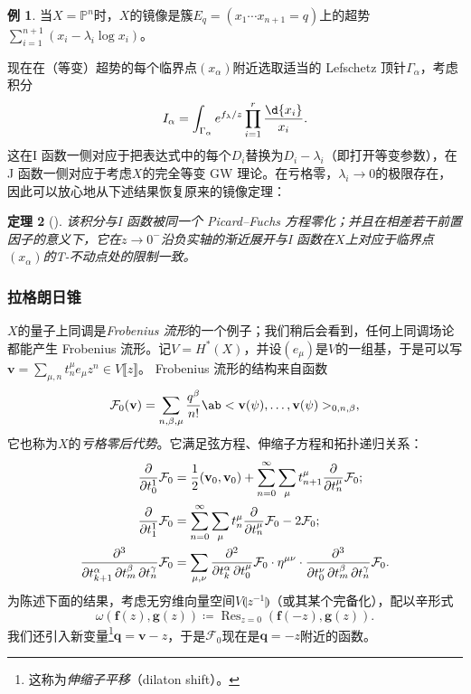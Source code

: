 \documentclass{amsart}
\newtheorem{thm}{定理}[section]
\theoremstyle{definition}
\newtheorem{exm}[thm]{例}
\theoremstyle{remark}
\theoremstyle{plain}
\theoremstyle{definition}
\theoremstyle{remark}
\renewcommand{\P}{\mathbb{P}}
\newcommand{\mc}[1]{\mathcal{#1}}
\newcommand{\mbf}[1]{\mathbf{#1}}
\newcommand{\bv}{\mbf{v}}
\newcommand{\bq}{\mbf{q}}
\newcommand{\on}[1]{\operatorname{#1}}
\newcommand{\1}{\mathbf{1}}
\newcommand{\2}{\mathbf{2}}
\newcommand{\3}{\mathbf{3}}
\newcommand{\ps}[1]{\llbracket #1 \rrbracket}
\newcommand{\ls}[1]{\llparenthesis #1 \rrparenthesis}
\begin{document}
\begin{exm}
    当\(X = \P^n\)时，\(X\)的镜像是簇\(E_q = (x_1 \cdots x_{n+1} = q)\)上的超势\(\sum_{i=1}^{n+1} (x_i - \lambda_i \log x_i)\)。
\end{exm}

现在在（等变）超势的每个临界点\((x_{\alpha})\)附近选取适当的 Lefschetz 顶针\(\Gamma_{\alpha}\)，考虑积分
\[ I_{\alpha} = \int_{\Gamma_{\alpha}} e^{f_{\lambda}/z} \prod_{i=1}^r \frac{\d{x_i}}{x_i}. \]
这在I 函数一侧对应于把表达式中的每个\(D_i\)替换为\(D_i - \lambda_i\)（即打开等变参数），在J 函数一侧对应于考虑\(X\)的完全等变 GW 理论。在亏格零，\(\lambda_i \to 0\)的极限存在，因此可以放心地从下述结果恢复原来的镜像定理：

\begin{thm}[{\cite{Givental1996}}]
    该积分与I 函数被同一个 Picard--Fuchs 方程零化；并且在相差若干前置因子的意义下，它在\(z \to 0^-\)沿负实轴的渐近展开与I 函数在\(X\)上对应于临界点\(( x_{\alpha} )\)的T-不动点处的限制一致。
\end{thm}


\subsubsection{拉格朗日锥}%
\label{ssub:The Lagrangian cone}

\(X\)的量子上同调是\textit{Frobenius 流形}的一个例子；我们稍后会看到，任何上同调场论都能产生 Frobenius 流形。记\(V = H^*(X)\)，并设\((e_{\mu})\)是\(V\)的一组基，于是可以写$\bv = \sum_{\mu,n} t^{\mu}_n e_{\mu} z^n \in V\ps{z}$。
Frobenius 流形的结构来自函数
\[
    \mc{F}_0(\bv) = \sum_{n, \beta, \mu} \frac{q^{\beta}}{n!} \ab<\bv(\psi), \ldots, \bv(\psi)>_{0,n,\beta},
\]
它也称为\(X\)的\textit{亏格零后代势}。它满足弦方程、伸缩子方程和拓扑递归关系：
\begin{align*}
    \pdv{}{t_0^1} \mc{F}_0 &= \frac{1}{2} (\bv_0, \bv_0) + \sum_{n=0}^{\infty} \sum_{\mu} t_{n+1}^{\mu} \pdv{}{t_n^{\mu}} \mc{F}_0; \\
    \pdv{}{t_1^1} \mc{F}_0 &= \sum_{n=0}^{\infty} \sum_{\mu} t_n^{\mu} \pdv{}{t_n^{\mu}}\mc{F}_0 - 2 \mc{F}_0; \\
    \pdv{}{t_{k+1}^{\alpha},t_m^{\beta},t_n^{\gamma}} \mc{F}_0 &= \sum_{\mu,\nu} \pdv{}{t_k^{\alpha},t_0^{\mu}} \mc{F}_0 \cdot \eta^{\mu\nu} \cdot \pdv{}{t_0^{\nu},t_{m}^{\beta},t_n^{\gamma}} \mc{F}_0.
\end{align*}
为陈述下面的结果，考虑无穷维向量空间$V\ls{z^{-1}}$（或其某个完备化），配以辛形式
\[ \omega(\mbf{f}(z), \mbf{g}(z)) \coloneqq \on{Res}_{z=0}(\mbf{f}(-z), \mbf{g}(z)). \]
我们还引入新变量\footnote{这称为\textit{伸缩子平移}（dilaton shift）。}$\bq = \bv - z$，于是$\mc{F}_0$现在是$\bq = -z$附近的函数。
\end{document}

